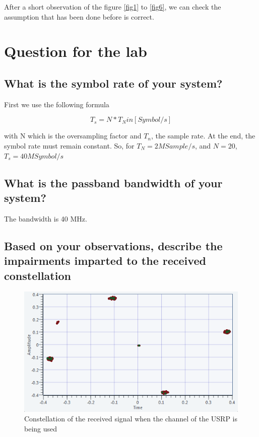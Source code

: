 \documentclass[frenchb, oneside, headings=normal]{scrartcl}
\begin{document}
After a short observation of the figure \ref{fig1} to \ref{fig6}, we can check the assumption that has been done before is correct. 


\newpage
\section{Question for the lab}

\subsection{What is the symbol rate of your system?}

First we use the following formula

\begin{equation}
T_s=N*T_N in [Symbol/s]
\end{equation}

with N which is the oversampling factor and $T_n$, the sample rate. At the end, the symbol rate must remain constant. So, for $T_N=2M Sample/s$, and $N=20$, \textbf{$T_s=40 MSymbol/s$}

\subsection{What is the passband bandwidth of your system?}

The bandwidth is 40 MHz.

\subsection{Based on your observations, describe the impairments imparted to the received constellation}

\begin{figure}[ht!]
\centering
\includegraphics[scale=0.9]{img/USRP-Rotate.png}
\caption{Constellation of the received signal when the channel of the USRP is being used}
\label{usrp}
\end{figure}
\end{document}
